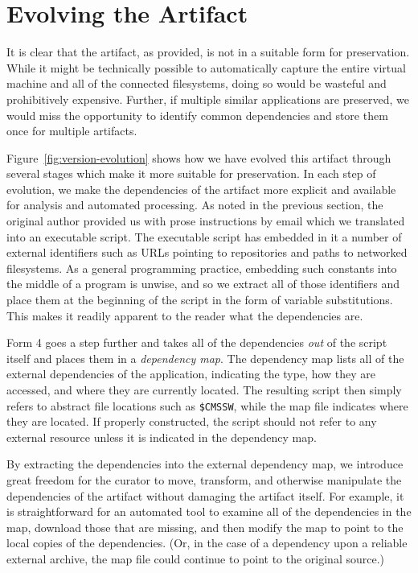 \documentclass{sig-alternate}
\begin{document}
\fi

\section{Evolving the Artifact}

It is clear that the artifact, as provided, is not in a suitable form
for preservation.  While it might be technically possible to automatically
capture the entire virtual machine and all of the connected filesystems,
doing so would be wasteful and prohibitively expensive.  Further, if multiple
similar applications are preserved, we would miss the opportunity to identify
common dependencies and store them once for multiple artifacts.

Figure~\ref{fig:version-evolution} shows how we have evolved this artifact
through several stages which make it more suitable for preservation.
In each step of evolution, we make the dependencies of the artifact
more explicit and available for analysis and automated processing.
As noted in the previous section, the original author provided us with
prose instructions by email which we translated into an
executable script.  The executable script has embedded in it
a number of external identifiers such as URLs pointing to repositories
and paths to networked filesystems.  As a general programming practice,
embedding such constants into the middle of a program is unwise, and so
we extract all of those identifiers and place them at the beginning
of the script in the form of variable substitutions.  This makes
it readily apparent to the reader what the dependencies are.

Form 4 goes a step further and takes all of the dependencies \emph{out}
of the script itself and places them in a \emph{dependency map}.
The dependency map lists all of the external dependencies of the application, indicating
the type, how they are accessed, and where they are currently located.
The resulting script then simply refers to abstract file locations such
as \verb!$CMSSW!, while the map file indicates where they are located.
If properly constructed, the script should not refer to any external
resource unless it is indicated in the dependency map.

By extracting the dependencies into the external dependency map,
we introduce great freedom for the curator to move, transform, and otherwise
manipulate the dependencies of the artifact without damaging the artifact itself.
For example, it is straightforward for an automated tool to examine
all of the dependencies in the map, download those that are missing,
and then modify the map to point to the local copies of the dependencies.
(Or, in the case of a dependency upon a reliable external archive,
the map file could continue to point to the original source.)
\end{document}
